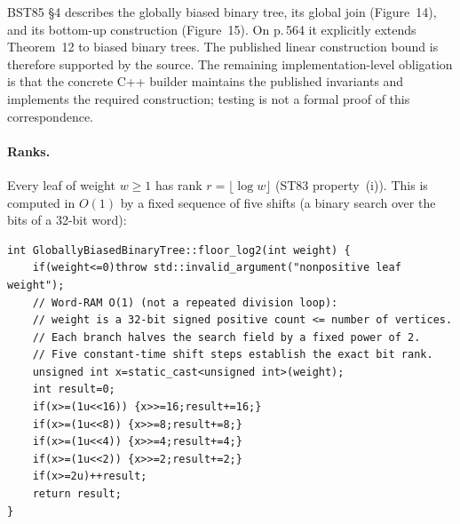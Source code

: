 \documentclass[11pt,a4paper,oneside]{report}
\theoremstyle{plain}
\theoremstyle{definition}
\theoremstyle{remark}
\DeclareRobustCommand{\file}[1]{\mtp_breakable_tt:n {#1}}
\begin{document}
\begin{caution}
BST85 \S4 describes the globally biased binary tree, its global join (Figure~14),
and its bottom-up construction (Figure~15). On p.\,564 it explicitly extends
Theorem~12 to biased binary trees. The published linear construction bound is
therefore supported by the source. The remaining implementation-level obligation
is that the concrete C++ builder maintains the published invariants and implements
the required construction; testing is not a formal proof of this correspondence.
\end{caution}

\paragraph{Ranks.} Every leaf of weight \(w\ge 1\) has rank \(r=\lfloor\log w\rfloor\) (ST83
property~(i)). This is computed in \(O(1)\) by a fixed sequence of five shifts (a binary search
over the bits of a 32-bit word):

\begin{lstlisting}[style=cpp,firstnumber=11,caption={\file{src/globally_biased_binary_tree.cpp}, lines 11--25: constant-time rank of a weight.},label={lst:floorlog}]
int GloballyBiasedBinaryTree::floor_log2(int weight) {
    if(weight<=0)throw std::invalid_argument("nonpositive leaf weight");
    // Word-RAM O(1) (not a repeated division loop):
    // weight is a 32-bit signed positive count <= number of vertices.
    // Each branch halves the search field by a fixed power of 2.
    // Five constant-time shift steps establish the exact bit rank.
    unsigned int x=static_cast<unsigned int>(weight);
    int result=0;
    if(x>=(1u<<16)) {x>>=16;result+=16;}
    if(x>=(1u<<8)) {x>>=8;result+=8;}
    if(x>=(1u<<4)) {x>>=4;result+=4;}
    if(x>=(1u<<2)) {x>>=2;result+=2;}
    if(x>=2u)++result;
    return result;
}
\end{lstlisting}
\end{document}

